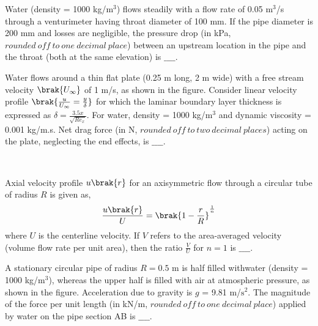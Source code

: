 \iffalse
\chapter{2023}
\author{AI24BTECH11009}
\section{xe}
\fi

\item Water (density = 1000 kg/$\text{m}^3$) flows steadily with a flow rate of 0.05 $\text{m}^3$/s through a venturimeter having throat diameter of 100 mm. If the pipe diameter is 200 mm and losses are negligible, the pressure drop (in kPa, $rounded\ off\ to\ one\ decimal\ place$) between an upstream location in the pipe and the throat (both at the same elevation) is $\_\_\_\_$. \\
\item Water flows around a thin flat plate (0.25 m long, 2 m wide) with a free stream velocity $\brak{U_{\infty}}$ of 1 m/s, as shown in the figure. Consider linear velocity profile $\brak{\frac{u}{U_{\infty}} = \frac{y}{\delta}}$ for which the laminar boundary layer thickness is expressed as $\delta = \frac{3.5x}{\sqrt{Re_x}}$. For water, density = 1000 kg/$\text{m}^3$ and dynamic viscosity = 0.001 kg/m.s. Net drag force (in N, $rounded\ off\ to\ two\ decimal\ places$) acting on the plate, neglecting the end effects, is $\_\_\_\_$. 
\begin{figure}[!ht]
\centering
\resizebox{0.7\textwidth}{!}{%

}%
\end{figure} \\
\item Axial velocity profile $u\brak{r}$ for an axisymmetric flow through a circular tube of radius $R$ is given as,
\begin{align*}
    \frac{u\brak{r}}{U} = \brak{1 - \frac{r}{R}}^{\frac{1}{n}}
\end{align*}
where $U$ is the centerline velocity. If $V$ refers to the area-averaged velocity (volume flow rate per unit area), then the ratio $\frac{V}{U}$ for $n = 1$  is $\_\_\_\_$. \\
\item A stationary circular pipe of radius $R = 0.5$ m is half filled withwater (density = 1000 kg/$\text{m}^3$), whereas the upper half is filled with air at atmospheric pressure, as shown in the figure. Acceleration due to gravity is $g$ = 9.81 m/$\text{s}^2$. The magnitude of the force per unit length (in kN/m, $rounded\ off\ to\ one\ decimal\ place$) applied by water on the pipe section AB is $\_\_\_\_$.
